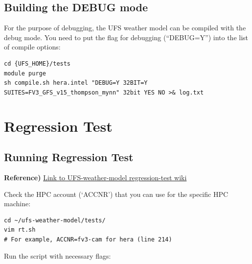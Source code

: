 \documentclass[11pt,fleqn]{report}              %
\begin{document}
\subsection{Building the DEBUG mode}

For the purpose of debugging, the UFS weather model can be compiled with the debug mode. You need to put the flag for debugging (``DEBUG=Y'') into the list of compile options:
\lstset{language=bash}   
\begin{lstlisting}[frame=trBL]
cd {UFS_HOME}/tests
module purge
sh compile.sh hera.intel "DEBUG=Y 32BIT=Y SUITES=FV3_GFS_v15_thompson_mynn" 32bit YES NO >& log.txt
\end{lstlisting}



\section{Regression Test}
\label{sec:dev_regression}

\subsection{Running Regression Test}

{\bf Reference)} \href{https://github.com/ufs-community/ufs-weather-model/wiki/Running-regression-test-using-rt.sh}{Link to UFS-weather-model regression-test wiki} 

\vspace{0.3cm}

Check the HPC account (`ACCNR') that you can use for the specific HPC machine:
\lstset{language=bash}   
\begin{lstlisting}[frame=trBL]
cd ~/ufs-weather-model/tests/
vim rt.sh
# For example, ACCNR=fv3-cam for hera (line 214)
\end{lstlisting}

Run the script with necessary flags:
\end{document}
